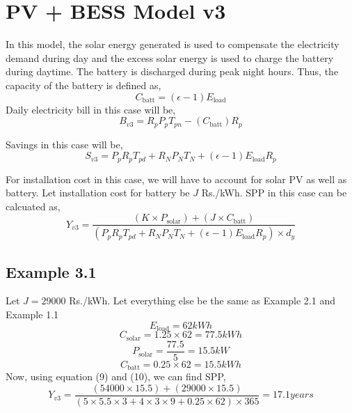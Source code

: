 \documentclass{article}
\begin{document}
\section{PV + BESS Model v3}

In this model, the solar energy generated is used to compensate the electricity demand during day and the excess solar energy is used to charge the battery during daytime.
The battery is discharged during peak night hours. Thus, the capacity of the battery is defined as,
\[
C_{\text{batt}} = ( \epsilon - 1 ) E_{\text{load}}       \tag{8}
\] 
Daily electricity bill in this case will be,
\[
B_{v3} = R_p P_p T_{pn} - (C_{\text{batt}}) R_p
\]

Savings in this case will be,
\[
S_{v3} =  P_p R_p T_{pd} + R_N P_N T_N + ( \epsilon - 1 ) E_{\text{load}} R_p   \tag{9}  
\]

For installation cost in this case, we will have to account for solar PV as well as battery. Let installation cost for battery be \( J \) Rs./kWh.
SPP in this case can be calcuated as,
\[
Y_{v3} = \frac{(K \times P_{\text{solar}}) + (J \times C_{\text{batt}})}{(P_p R_p T_{pd} + R_N P_N T_N + ( \epsilon - 1 ) E_{\text{load}} R_p) \times d_y}    \tag{10}   
\]

\subsection{Example 3.1}
Let \( J = 29000\) Rs./kWh. Let everything else be the same as Example 2.1 and Example 1.1
\[
E_{\text{load}} = 62 kWh       
\] 
\[
C_{\text{solar}} = 1.25 \times 62 = 77.5 kWh
\]
\[
P_{\text{solar}} = \frac{77.5}{5} = 15.5 kW       
\]
\[
C_{\text{batt}} = 0.25 \times 62 = 15.5 kWh       
\]
Now, using equation (9) and (10), we can find SPP,
\[
Y_{v3} = \frac{(54000 \times 15.5) + (29000 \times 15.5)}{(5 \times 5.5 \times 3 + 4 \times 3 \times 9 + 0.25 \times 62) \times 365} 
       = 17.1 years      
\]
\end{document}
